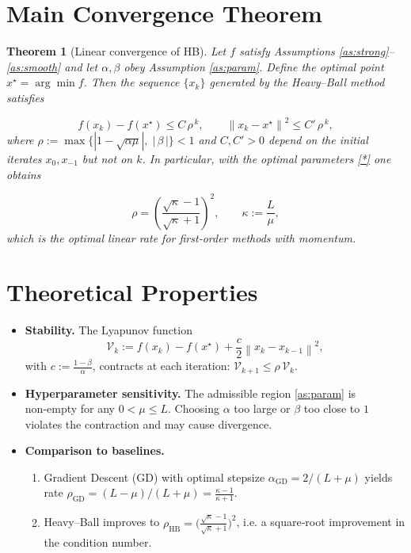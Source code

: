\documentclass{article}
\newtheorem{theorem}{Theorem}
\newcommand{\norm}[1]{\left\|#1\right\|}
\begin{document}
\section*{Main Convergence Theorem}
\begin{theorem}[Linear convergence of HB]\label{thm:linear}
Let $f$ satisfy Assumptions \ref{as:strong}–\ref{as:smooth} and let $\alpha,\beta$ obey Assumption \ref{as:param}.  
Define the optimal point $x^\star=\arg\min f$.  
Then the sequence $\{x_k\}$ generated by the Heavy–Ball method satisfies  

\[
\boxed{
f(x_k)-f(x^\star)\le C\,\rho^{\,k},\qquad
\norm{x_k-x^\star}^{2}\le C'\,\rho^{\,k},
}
\]
where $\rho:=\max\bigl\{|1-\sqrt{\alpha\mu}|,\;|\,\beta\,|\bigr\}<1$ and $C,C'>0$ depend on the initial iterates $x_0,x_{-1}$ but not on $k$.
In particular, with the optimal parameters \eqref{*} one obtains  

\[
\rho = \left(\frac{\sqrt{\kappa}-1}{\sqrt{\kappa}+1}\right)^{2},\qquad 
\kappa:=\frac{L}{\mu},
\]
which is the optimal linear rate for first‑order methods with momentum.
\end{theorem}

\section*{Theoretical Properties}
\begin{itemize}[leftmargin=*]
\item \textbf{Stability.} The Lyapunov function  
\[
\mathcal{V}_k:=f(x_k)-f(x^\star)+\frac{c}{2}\norm{x_k-x_{k-1}}^{2},
\]
with $c:=\frac{1-\beta}{\alpha}$, contracts at each iteration: $\mathcal{V}_{k+1}\le\rho\,\mathcal{V}_k$.
\item \textbf{Hyperparameter sensitivity.} The admissible region \eqref{as:param} is non‑empty for any $0<\mu\le L$. Choosing $\alpha$ too large or $\beta$ too close to $1$ violates the contraction and may cause divergence.
\item \textbf{Comparison to baselines.}
    \begin{enumerate}
        \item Gradient Descent (GD) with optimal stepsize $\alpha_{\text{GD}}=2/(L+\mu)$ yields rate $\rho_{\text{GD}}= (L-\mu)/(L+\mu)=\frac{\kappa-1}{\kappa+1}$.
        \item Heavy–Ball improves to $\rho_{\text{HB}}=\bigl(\frac{\sqrt{\kappa}-1}{\sqrt{\kappa}+1}\bigr)^{2}$, i.e. a square‑root improvement in the condition number.
    \end{enumerate}
\end{itemize}
\end{document}
